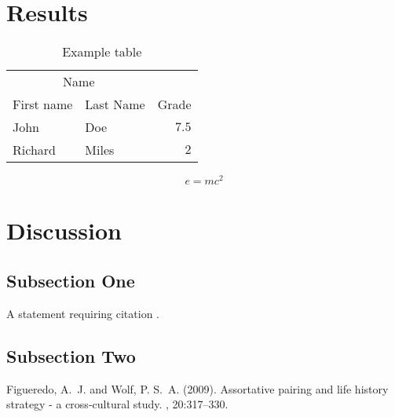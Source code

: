 \documentclass[twoside,twocolumn]{article}
\begin{document}
\section{Results}

\begin{table}
\caption{Example table}
\centering
\begin{tabular}{llr}
\toprule
\multicolumn{2}{c}{Name} \\
\cmidrule(r){1-2}
First name & Last Name & Grade \\
\midrule
John & Doe & $7.5$ \\
Richard & Miles & $2$ \\
\bottomrule
\end{tabular}
\end{table}

\blindtext %

\begin{equation}
\label{eq:emc}
e = mc^2
\end{equation}

\blindtext %


\section{Discussion}

\subsection{Subsection One}

A statement requiring citation \cite{Figueredo:2009dg}.
\blindtext %

\subsection{Subsection Two}

\blindtext %


\begin{thebibliography}{99} %

Figueredo, A.~J. and Wolf, P. S.~A. (2009).
\newblock Assortative pairing and life history strategy - a cross-cultural
  study.
, 20:317--330.

\end{thebibliography}

\end{document}
